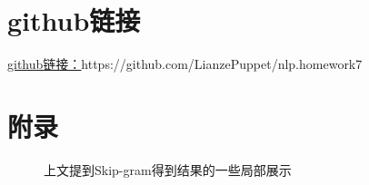 \documentclass[12pt]{article}
\begin{document}
\section{github链接}
\href{https://github.com/LianzePuppet/nlp.homework7}{\underline{github链接：}}https://github.com/LianzePuppet/nlp.homework7
\section{附录}

\begin{figure}[H]
  \centering
  \caption{上文提到Skip-gram得到结果的一些局部展示}
  \label{222}
\end{figure}
\end{document}
